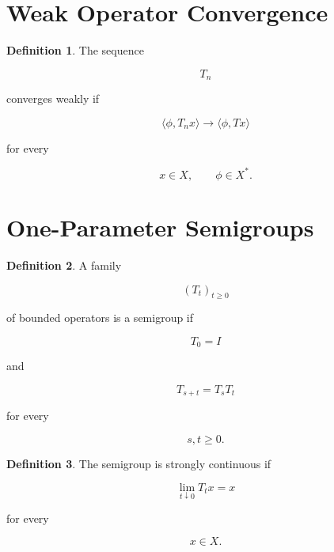 \documentclass[11pt]{book}
\numberwithin{equation}{chapter}
\theoremstyle{definition}
\newtheorem{definition}{Definition}[chapter]
\theoremstyle{plain}
\begin{document}

\section{Weak Operator Convergence}

\begin{definition}

The sequence

\[
T_n
\]

converges weakly if

\[
\langle
\phi,
T_nx
\rangle
\rightarrow
\langle
\phi,
Tx
\rangle
\]

for every

\[
x\in X,
\qquad
\phi\in X^*.
\]

\end{definition}


\section{One-Parameter Semigroups}

\begin{definition}

A family

\[
(T_t)_{t\ge0}
\]

of bounded operators is a semigroup if

\[
T_0=I
\]

and

\[
T_{s+t}
=
T_sT_t
\]

for every

\[
s,t\ge0.
\]

\end{definition}


\begin{definition}

The semigroup is strongly continuous if

\[
\lim_{t\downarrow0}
T_tx
=
x
\]

for every

\[
x\in X.
\]

\end{definition}

\end{document}
